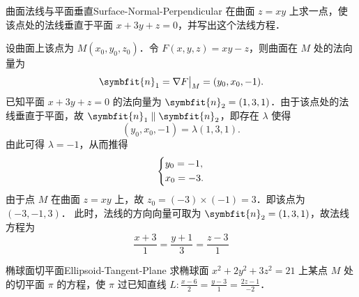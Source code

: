 \begin{problem}{曲面法线与平面垂直}{Surface-Normal-Perpendicular}
    在曲面 $z = xy$ 上求一点，使该点处的法线垂直于平面 $x + 3y + z = 0$，并写出这个法线方程．
\end{problem}

\begin{solution}
    设曲面上该点为 $M(x_0, y_0, z_0)$．令 $F(x, y, z) = xy - z$，则曲面在 $M$ 处的法向量为
    \begin{equation}
        \symbfit{n}_1 = \nabla F \big|_M = (y_0, x_0, -1).
    \end{equation}
    已知平面 $x + 3y + z = 0$ 的法向量为 $\symbfit{n}_2 = (1, 3, 1)$．由于该点处的法线垂直于平面，故 $\symbfit{n}_1 \parallel \symbfit{n}_2$，即存在 $\lambda$ 使得
    \begin{equation}
        (y_0, x_0, -1) = \lambda (1, 3, 1).
    \end{equation}
    由此可得 $\lambda = -1$，从而推得
    \begin{equation}
        \begin{dcases}
            y_0 = -1, \\
            x_0 = -3.
        \end{dcases}
    \end{equation}
    由于点 $M$ 在曲面 $z = xy$ 上，故 $z_0 = (-3) \times (-1) = 3$．即该点为 $(-3, -1, 3)$．
    此时，法线的方向向量可取为 $\symbfit{n}_2 = (1, 3, 1)$，故法线方程为
    \begin{equation}
        \boxed{\frac{x + 3}{1} = \frac{y + 1}{3} = \frac{z - 3}{1}}
    \end{equation}
\end{solution}


\begin{problem}{椭球面切平面}{Ellipsoid-Tangent-Plane}
    求椭球面 $x^2 + 2y^2 + 3z^2 = 21$ 上某点 $M$ 处的切平面 $\pi$ 的方程，使 $\pi$ 过已知直线 $L: \frac{x - 6}{2} = \frac{y - 3}{1} = \frac{2z - 1}{-2}$．
\end{problem}

